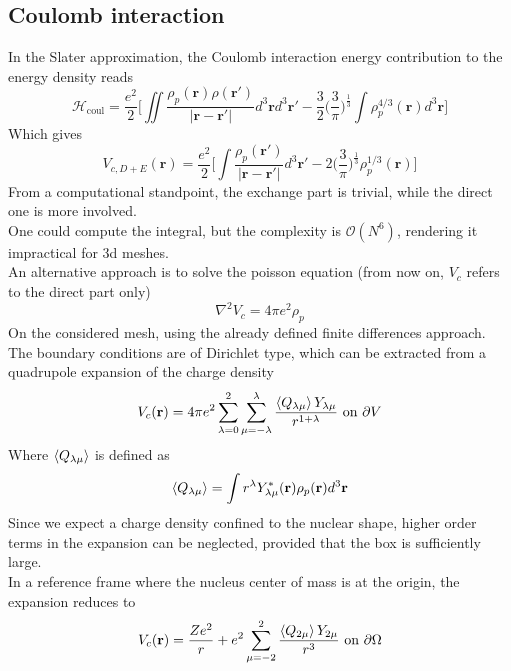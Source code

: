 \newpage
\subsection{Coulomb interaction}
In the Slater approximation, the Coulomb interaction energy contribution to the energy density reads
\begin{equation}
    \mathcal H_\text{coul} = \frac{e^2}{2}\bigg[\iint  \frac{\rho_p(\mathbf r )\rho(\mathbf r ' )}{|\mathbf r-\mathbf r'|}d^3\mathbf r d^3\mathbf r' - \frac 3 2 \bigg(\frac 3 \pi \bigg) ^{\frac 1 3}\int \rho_p^{4/3}(\mathbf r)d^3\mathbf r\bigg]
\end{equation}
Which gives
\begin{equation}
    V_{c, D+E}(\mathbf r) = \frac{e^2}{2}\bigg[\int \frac{\rho_p(\mathbf r ')}{|\mathbf r-\mathbf r'|} d^3 \mathbf r' - 2\bigg(\frac 3 \pi \bigg) ^{\frac 1 3} \rho_p^{1/3}(\mathbf r ) \bigg]
\end{equation}
From a computational standpoint, the exchange part is trivial, while the direct one is more involved.
\\One could compute the integral, but the complexity is $\mathcal O(N^6)$, rendering it impractical for 3d meshes.
\\An alternative approach is to solve the poisson equation (from now on, $V_c$ refers to the direct part only)
\begin{equation}
    \nabla^2 V_c = 4\pi e^2 \rho_p
\end{equation}
On the considered mesh, using the already defined finite differences approach.
\\The boundary conditions are of Dirichlet type, which can be extracted from a quadrupole expansion of the charge density
\begin{equation}
V_c (\mathbf r) = 4\pi e^2 \sum_{\lambda=0}^2\sum_{\mu=-\lambda}^\lambda \frac{\expval{Q_{\lambda\mu}} Y_{\lambda\mu}}{r^{1+\lambda}}\text{ on }\partial V
\end{equation}
Where $\expval{Q_{\lambda\mu}}$ is defined as 
\begin{equation}
    \expval{Q_{\lambda\mu}} = \int r^\lambda Y_{\lambda\mu}^* (\mathbf r)\rho_p(\mathbf r ) d^3 \mathbf r
\end{equation}
Since we expect a charge density confined to the nuclear shape, higher order terms in the expansion can be neglected, provided that the box is sufficiently large.
\\In a reference frame where the nucleus center of mass is at the origin, the expansion reduces to
\begin{equation}
    V_{c}(\mathbf r ) = \frac{Ze^2}{r} + e^2\sum_{\mu=-2}^{2}\frac{\expval{Q_{2\mu}}Y_{2\mu}}{r^3} \text{ on } \partial \Omega
\end{equation}
